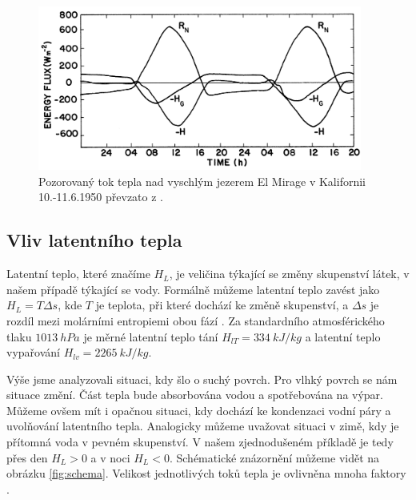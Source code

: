 \begin{figure}
	\centering
	\includegraphics[width=0.95\textwidth]{img/ch1/energy_drylakebed.png}
	\caption{Pozorovaný tok tepla nad vyschlým jezerem El Mirage v Kalifornii 10.-11.6.1950 převzato z \parencite{arya2001}.}
	\label{fig:energy_drylakebed}
\end{figure}

\subsection{Vliv latentního tepla}\label{chap:latentheat}
Latentní teplo, které značíme $H_L$, je veličina týkající se změny skupenství látek, v našem případě týkající se vody. Formálně můžeme latentní teplo zavést jako $H_L = T\Delta s$, kde $T$ je teplota, při které dochází ke změně skupenství, a $\Delta s$ je rozdíl mezi molárními entropiemi obou fází \parencite{callen1985}. Za standardního atmosférického tlaku $\SI{1013}{hPa}$ je měrné latentní teplo tání $H_{lT} = \SI{334}{kJ/kg}$ a latentní teplo vypařování $H_{lv} = \SI{2265}{kJ/kg}$. 

Výše jsme analyzovali situaci, kdy šlo o suchý povrch. Pro vlhký povrch se nám situace změní. Část tepla bude absorbována vodou a spotřebována na výpar. Můžeme ovšem mít i opačnou situaci, kdy dochází ke kondenzaci vodní páry a uvolňování latentního tepla. Analogicky můžeme uvažovat situaci v zimě, kdy je přítomná voda v pevném skupenství. V našem zjednodušeném příkladě je tedy přes den $H_L > 0$ a v noci $H_L < 0$. Schématické znázornění můžeme vidět na obrázku \ref{fig:schema}. Velikost jednotlivých toků tepla je ovlivněna mnoha faktory \parencite{arya2001}.

